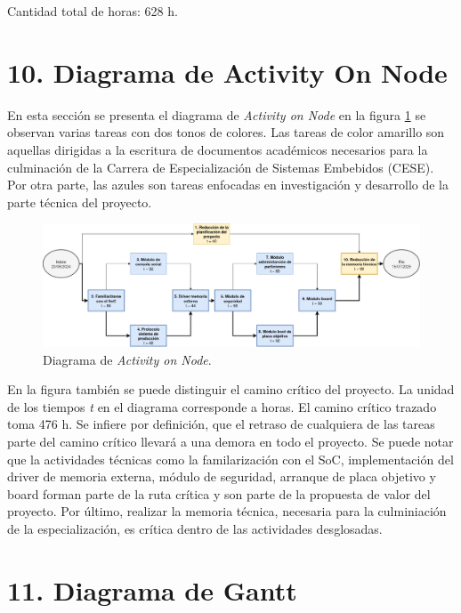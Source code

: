 \documentclass[
11pt, %
]{charter}
\begin{document}
Cantidad total de horas: 628 h.

\newpage

\section{10. Diagrama de Activity On Node}
\label{sec:AoN}

En esta sección se presenta el diagrama de \textit{Activity on Node} en la figura \ref{fig:AoN} se observan varias tareas con dos tonos de colores. Las tareas de color amarillo son aquellas dirigidas a la escritura de documentos académicos necesarios para la culminación de la Carrera de Especialización de Sistemas Embebidos (CESE). Por otra parte, las azules son tareas enfocadas en investigación y desarrollo de la parte técnica del proyecto.

\begin{figure}[htpb]
\centering 
\includegraphics[width=1.0\textwidth]{./Figuras/GdPDiagrams-AoN_sec9.png}
\caption{Diagrama de \textit{Activity on Node}.}
\label{fig:AoN}
\end{figure}

En la figura también se puede distinguir el camino crítico del proyecto. La  unidad de los tiempos \textit{t} en el diagrama corresponde a horas. El camino crítico trazado toma 476 h. Se infiere por definición, que el retraso de cualquiera de las tareas parte del camino crítico llevará a una demora en todo el proyecto. Se puede notar que la actividades técnicas como la familarización con el SoC, implementación del driver de memoria externa, módulo de seguridad, arranque de placa objetivo y board forman parte de la ruta crítica y son parte de la propuesta de valor del proyecto. Por último, realizar la memoria técnica, necesaria para la culminiación de la especialización, es crítica dentro de las actividades desglosadas.

\section{11. Diagrama de Gantt}
\label{sec:gantt}
\end{document}
